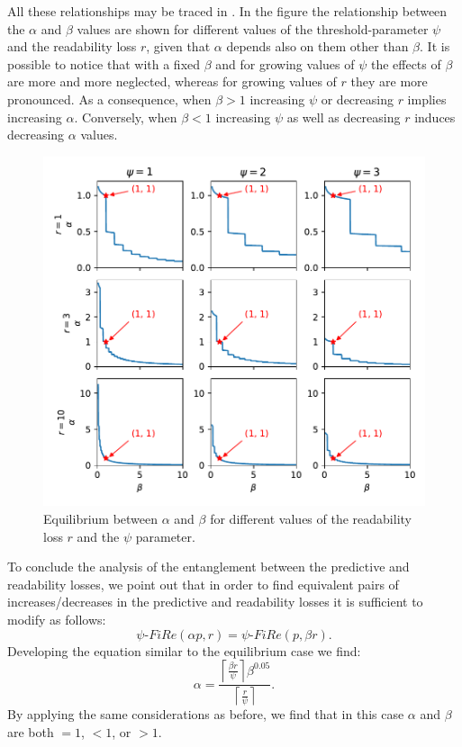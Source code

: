 \documentclass{article}
\newcommand{\fire}{FiRe}
\begin{document}
All these relationships may be traced in .
%
In the figure the relationship between the $\alpha$ and $\beta$ values are shown for different values of the threshold-parameter $\psi$ and the readability loss $r$, given that $\alpha$ depends also on them other than $\beta$.
%
It is possible to notice that with a fixed $\beta$ and for growing values of $\psi$ the effects of $\beta$ are more and more neglected, whereas for growing values of $r$ they are more pronounced.
%
As a consequence, when $\beta > 1$ increasing $\psi$ or decreasing $r$ implies increasing $\alpha$.
%
Conversely, when $\beta < 1$ increasing $\psi$ as well as decreasing $r$ induces decreasing $\alpha$ values.

\begin{figure}
	\centering
	\includegraphics[width=1.02\linewidth]{figures/equi.pdf}
	\caption{Equilibrium between $\alpha$ and $\beta$ for different values of the readability loss $r$ and the $\psi$ parameter.}\label{fig:equi}
\end{figure}

To conclude the analysis of the entanglement between the predictive and readability losses, we point out that in order to find equivalent pairs of increases/decreases in the predictive and readability losses it is sufficient to modify  as follows:
%
\begin{equation}\label{eq:equi3}
	\psi\textrm{-}\fire(\alpha p, r) = \psi\textrm{-}\fire(p, \beta r).
\end{equation}
%
Developing the equation similar to the equilibrium case we find:
%
\begin{equation}\label{eq:alpha2}
	\alpha = \frac{\left \lceil{\frac{\beta r}{\psi}}\right \rceil \beta^{0.05}}{\left \lceil{\frac{r}{\psi}}\right \rceil}.
\end{equation}
%
By applying the same considerations as before, we find that in this case $\alpha$ and $\beta$ are both $=1$, $<1$, or $>1$.
\end{document}
